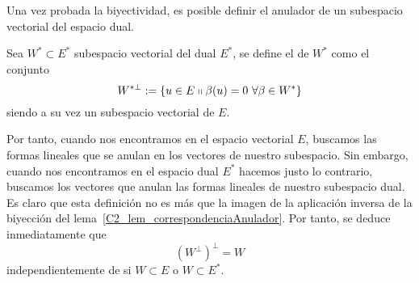 Una vez probada la biyectividad, es posible definir el anulador de un subespacio vectorial del espacio dual.
\begin{defi}
	\label{C2_def_anuladorDual}
	Sea $W^*\subset E^*$ subespacio vectorial del dual $E^*$, se define el  de $W^*$ como el conjunto
	\begin{equation}
	W^{*\perp}:=\{u\in E\shortparallel \beta(u)=0 \ \forall \beta\in W^*\}
	\end{equation}
	siendo a su vez un subespacio vectorial de $E$.
\end{defi}
Por tanto, cuando nos encontramos en el espacio vectorial $E$, buscamos las formas lineales que se anulan en los vectores de nuestro subespacio. Sin embargo, cuando nos encontramos en el espacio dual $E^*$ hacemos justo lo contrario, buscamos los vectores que anulan las formas lineales de nuestro subespacio dual. Es claro que esta definición no es más que la imagen de la aplicación inversa de la biyección del lema~\ref{C2_lem_correspondenciaAnulador}. Por tanto, se deduce inmediatamente que 
\begin{equation}
	(W^{\perp})^{\perp}=W
\end{equation}
independientemente de si $W\subset E$ o $W\subset E^*$.

